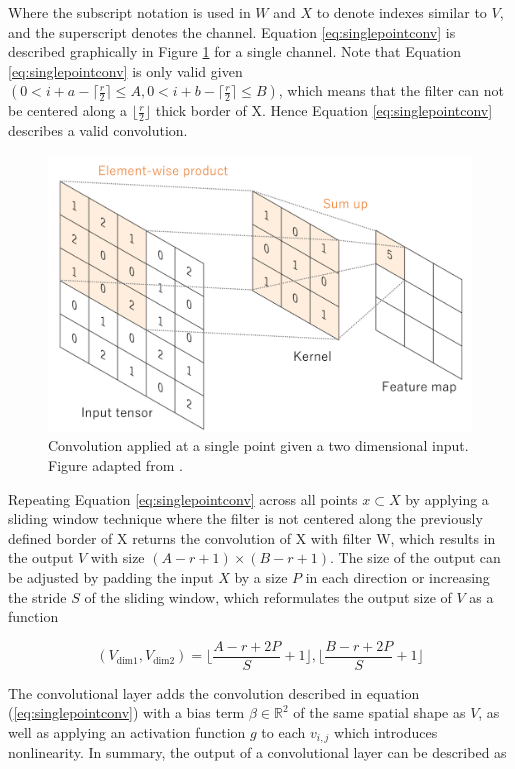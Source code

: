 \documentclass[../main/thesis.tex]{subfiles}
\begin{document}
Where the subscript notation is used in $W$ and $X$ to denote indexes similar to $V$, and the superscript denotes the channel. Equation \ref{eq:singlepointconv} is described graphically in Figure \ref{fig:convlayer} for a single channel. Note that Equation \ref{eq:singlepointconv} is only valid given $(0 < i + a - \lceil \frac{r}{2} \rceil \leq A, 0 < i + b - \lceil \frac{r}{2} \rceil \leq B)$, which means that the filter can not be centered along a $\lfloor \frac{r}{2} \rfloor$ thick border of X. Hence Equation \ref{eq:singlepointconv} describes a valid convolution.

\begin{figure}
    \centering
    \includegraphics[width=.6\textwidth]{convlayer}
    \caption{\label{fig:convlayer}Convolution applied at a single point given a two dimensional input. Figure adapted from \protect\citet{Yamashita2018}.}
\end{figure}

Repeating Equation \ref{eq:singlepointconv} across all points $x \subset X$ by applying a sliding window technique where the filter is not centered along the previously defined border of X returns the convolution of X with filter W, which results in the output $V$ with size $(A-r+1) \times (B-r+1)$. The size of the output can be adjusted by padding the input $X$ by a size $P$ in each direction or increasing the stride $S$ of the sliding window, which reformulates the output size of $V$ as a function

\begin{equation}
    \label{eq:outputdim}
    (V_\text{dim1}, V_\text{dim2}) = \lfloor\frac{A - r + 2P}{S} + 1\rfloor, \lfloor\frac{B - r + 2P}{S} + 1\rfloor
\end{equation}

The convolutional layer adds the convolution described in equation (\ref{eq:singlepointconv}) with a bias term $\beta \in{\mathbb{R}^2}$ of the same spatial shape as $V$, as well as applying an activation function $g$ to each $v_{i,j}$ which introduces nonlinearity. In summary, the output of a convolutional layer can be described as 
\end{document}
